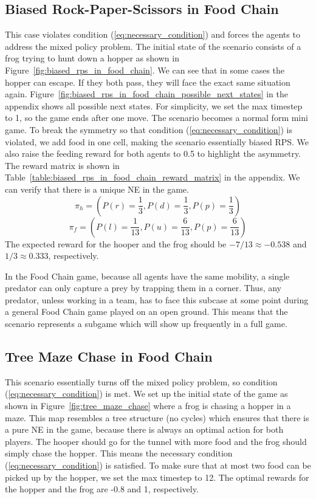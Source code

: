 \documentclass[]{interact}
\theoremstyle{plain}%
\theoremstyle{definition}
\theoremstyle{remark}
\begin{document}
\subsection{Biased Rock-Paper-Scissors in Food Chain}
This case violates condition (\ref{eq:necessary_condition}) and forces the agents to address the mixed policy problem. The initial state of the scenario consists of a frog trying to hunt down a hopper as shown in Figure~\ref{fig:biased_rps_in_food_chain}. We can see that in some cases the hopper can escape. If they both pass, they will face the exact same situation again. Figure~\ref{fig:biased_rps_in_food_chain_possible_next_states} in the appendix shows all possible next states. For simplicity, we set the max timestep to 1, so the game ends after one move. The scenario becomes a normal form mini game. To break the symmetry so that condition (\ref{eq:necessary_condition}) is violated, we add food in one cell, making the scenario essentially biased RPS. We also raise the feeding reward for both agents to 0.5 to highlight the asymmetry. The reward matrix is shown in Table~\ref{table:biased_rps_in_food_chain_reward_matrix} in the appendix. We can verify that there is a unique NE in the game.
\begin{equation}
    \pi_h=(P(r)=\frac{1}{3},P(d)=\frac{1}{3},P(p)=\frac{1}{3})
    \label{eq:biased_rps_in_food_chain_hopper_policy}
\end{equation}
\begin{equation}
    \pi_f=(P(l)=\frac{1}{13},P(u)=\frac{6}{13},P(p)=\frac{6}{13})
    \label{eq:biased_rps_in_food_chain_frog_policy}
\end{equation}
The expected reward for the hooper and the frog should be $-7/13 \approx -0.538$ and $1/3 \approx 0.333$, respectively.

In the Food Chain game, because all agents have the same mobility, a single predator can only capture a prey by trapping them in a corner. Thus, any predator, unless working in a team, has to face this subcase at some point during a general Food Chain game played on an open ground. This means that the scenario represents a subgame which will show up frequently in a full game.

\subsection{Tree Maze Chase in Food Chain}
This scenario essentially turns off the mixed policy problem, so condition (\ref{eq:necessary_condition}) is met. We set up the initial state of the game as shown in Figure~\ref{fig:tree_maze_chase} where a frog is chasing a hopper in a maze. This map resembles a tree structure (no cycles) which ensures that there is a pure NE in the game, because there is always an optimal action for both players. The hooper should go for the tunnel with more food and the frog should simply chase the hopper. This means the necessary condition (\ref{eq:necessary_condition}) is satisfied. To make sure that at most two food can be picked up by the hopper, we set the max timestep to 12. The optimal rewards for the hopper and the frog are -0.8 and 1, respectively.
\end{document}

